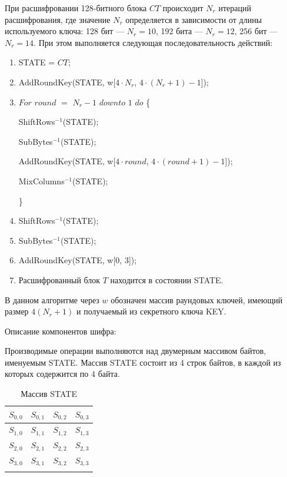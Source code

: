 \documentclass{./civarticle}
\begin{document}
При расшифровании 128-битного блока $CT$ происходит $N_r$ итераций расшифрования, где значение $N_r$ определяется в зависимости от длины используемого ключа: 128 бит --- $N_r = 10$, 192 бита --- $N_r = 12$, 256 бит --- $N_r = 14$. При этом выполняется следующая последовательность действий:
\begin{enumerate}
    \item STATE = $CT$;

    \item AddRoundKey(STATE, w[$4\cdot N_r$, $4\cdot (N_r + 1) - 1$]);

    \item $For$ $round$ $=$ $N_r - 1$ $downto$ $1$ $do$ \{ 

    \hspace{0.5cm} ShiftRows$^{-1}$(STATE);

    \hspace{0.5cm} SubBytes$^{-1}$(STATE);

    \hspace{0.5cm} AddRoundKey(STATE, w[$4\cdot round$, $4\cdot(round + 1) - 1$]);

    \hspace{0.5cm} MixColumns$^{-1}$(STATE);
    
    \}

    \item ShiftRows$^{-1}$(STATE);

    \item SubBytes$^{-1}$(STATE);

    \item AddRoundKey(STATE, w[0, 3]);

    \item Расшифрованный блок $T$ находится в состоянии STATE.
    
\end{enumerate}

В данном алгоритме через $w$ обозначен массив раундовых ключей, имеющий размер $4(N_r + 1)$ и получаемый из секретного ключа KEY.

Описание компонентов шифра:

Производимые операции выполняются над двумерным массивом байтов, именуемым STATE. Массив STATE состоит из 4 строк байтов, в каждой из которых содержится по 4 байта.

\begin{longtable}{|c|c|c|c|}
\hline
$S_{0, 0}$ & $S_{0, 1}$ & $S_{0, 2}$ & $S_{0, 3}$ \\
\hline
$S_{1, 0}$ & $S_{1, 1}$ & $S_{1, 2}$ & $S_{1, 3}$ \\
\hline
$S_{2, 0}$ & $S_{2, 1}$ & $S_{2, 2}$ & $S_{2, 3}$ \\
\hline
$S_{3, 0}$ & $S_{3, 1}$ & $S_{3, 2}$ & $S_{3, 3}$ \\
\hline
\caption{Массив STATE}
\end{longtable}
\end{document}
